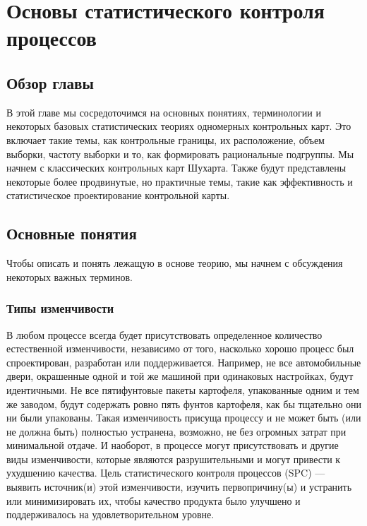 \chapter{Основы статистического контроля процессов}

\section*{Обзор главы}
В этой главе мы сосредоточимся на основных понятиях, терминологии и некоторых базовых статистических теориях одномерных контрольных карт. Это включает такие темы, как контрольные границы, их расположение, объем выборки, частоту выборки и то, как формировать рациональные подгруппы. Мы начнем с классических контрольных карт Шухарта. Также будут представлены некоторые более продвинутые, но практичные темы, такие как эффективность и статистическое проектирование контрольной карты.

\section{Основные понятия}
Чтобы описать и понять лежащую в основе теорию, мы начнем с обсуждения некоторых важных терминов.

\subsection{Типы изменчивости}
В любом процессе всегда будет присутствовать определенное количество естественной изменчивости, независимо от того, насколько хорошо процесс был спроектирован, разработан или поддерживается. Например, не все автомобильные двери, окрашенные одной и той же машиной при одинаковых настройках, будут идентичными. Не все пятифунтовые пакеты картофеля, упакованные одним и тем же заводом, будут содержать ровно пять фунтов картофеля, как бы тщательно они ни были упакованы. Такая изменчивость присуща процессу и не может быть (или не должна быть) полностью устранена, возможно, не без огромных затрат при минимальной отдаче. И наоборот, в процессе могут присутствовать и другие виды изменчивости, которые являются разрушительными и могут привести к ухудшению качества. Цель статистического контроля процессов (SPC) — выявить источник(и) этой изменчивости, изучить первопричину(ы) и устранить или минимизировать их, чтобы качество продукта было улучшено и поддерживалось на удовлетворительном уровне.

